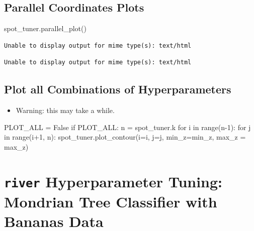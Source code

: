 \documentclass[
  letterpaper,
  DIV=11,
  numbers=noendperiod]{scrreprt}
\newenvironment{Shaded}{\begin{snugshade}}{\end{snugshade}}
\newcommand{\BuiltInTok}[1]{\textcolor[rgb]{0.00,0.23,0.31}{#1}}
\newcommand{\ControlFlowTok}[1]{\textcolor[rgb]{0.00,0.23,0.31}{#1}}
\newcommand{\DecValTok}[1]{\textcolor[rgb]{0.68,0.00,0.00}{#1}}
\newcommand{\KeywordTok}[1]{\textcolor[rgb]{0.00,0.23,0.31}{#1}}
\newcommand{\NormalTok}[1]{\textcolor[rgb]{0.00,0.23,0.31}{#1}}
\newcommand{\OperatorTok}[1]{\textcolor[rgb]{0.37,0.37,0.37}{#1}}
\newcommand{\VariableTok}[1]{\textcolor[rgb]{0.07,0.07,0.07}{#1}}
\providecommand{\tightlist}{%
  \setlength{\itemsep}{0pt}\setlength{\parskip}{0pt}}\usepackage{longtable,booktabs,array}
\begin{document}
\hypertarget{parallel-coordinates-plots-1}{%
\section{Parallel Coordinates
Plots}\label{parallel-coordinates-plots-1}}

\begin{Shaded}
\begin{Highlighting}[]
\NormalTok{spot\_tuner.parallel\_plot()}
\end{Highlighting}
\end{Shaded}

\begin{verbatim}
Unable to display output for mime type(s): text/html
\end{verbatim}

\begin{verbatim}
Unable to display output for mime type(s): text/html
\end{verbatim}

\hypertarget{plot-all-combinations-of-hyperparameters-6}{%
\section{Plot all Combinations of
Hyperparameters}\label{plot-all-combinations-of-hyperparameters-6}}

\begin{itemize}
\tightlist
\item
  Warning: this may take a while.
\end{itemize}

\begin{Shaded}
\begin{Highlighting}[]
\NormalTok{PLOT\_ALL }\OperatorTok{=} \VariableTok{False}
\ControlFlowTok{if}\NormalTok{ PLOT\_ALL:}
\NormalTok{    n }\OperatorTok{=}\NormalTok{ spot\_tuner.k}
    \ControlFlowTok{for}\NormalTok{ i }\KeywordTok{in} \BuiltInTok{range}\NormalTok{(n}\OperatorTok{{-}}\DecValTok{1}\NormalTok{):}
        \ControlFlowTok{for}\NormalTok{ j }\KeywordTok{in} \BuiltInTok{range}\NormalTok{(i}\OperatorTok{+}\DecValTok{1}\NormalTok{, n):}
\NormalTok{            spot\_tuner.plot\_contour(i}\OperatorTok{=}\NormalTok{i, j}\OperatorTok{=}\NormalTok{j, min\_z}\OperatorTok{=}\NormalTok{min\_z, max\_z }\OperatorTok{=}\NormalTok{ max\_z)}
\end{Highlighting}
\end{Shaded}

\hypertarget{river-hyperparameter-tuning-mondrian-tree-classifier-with-bananas-data}{%
\chapter{\texorpdfstring{\texttt{river} Hyperparameter Tuning: Mondrian
Tree Classifier with Bananas
Data}{river Hyperparameter Tuning: Mondrian Tree Classifier with Bananas Data}}\label{river-hyperparameter-tuning-mondrian-tree-classifier-with-bananas-data}}
\end{document}
